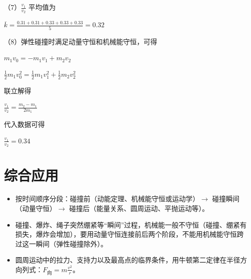 \documentclass[\gkver]{gaokaozhenti}
\begin{document}
\begin{enumerate}[resume=tiku]
{（7）$\frac{v_{1}}{v_{2}}$ 平均值为

$\overline{k}=\frac{0.31+0.31+0.33+0.33+0.33}{5}=0.32$

（8）弹性碰撞时满足动量守恒和机械能守恒，可得

$m_{1}v_{0}=-m_{1}v_{1}+m_{2}v_{2}$

$\frac{1}{2}m_{1}v_{0}^{2}=\frac{1}{2}m_{1}v_{1}^{2}+\frac{1}{2}m_{2}v_{2}^{2}$

联立解得

$\frac{v_{1}}{v_{2}}=\frac{m_{2}-m_{1}}{2m_{1}}$

代入数据可得

$\frac{v_{1}}{v_{2}}=0.34$
}

\end{enumerate}

\section{综合应用}
\begin{yaodian}
\begin{itemize}
\item 按时间顺序分段：碰撞前（动能定理、机械能守恒或运动学）$\rightarrow$ 碰撞瞬间（动量守恒）$\rightarrow$ 碰撞后（能量关系、圆周运动、平抛运动等）。
\item 碰撞、爆炸、绳子突然绷紧等“瞬间”过程，机械能一般不守恒（碰撞、绷紧有损失，爆炸会增加），要用动量守恒连接前后两个阶段，不能用机械能守恒跨过这一瞬间（弹性碰撞除外）。
\item 圆周运动中的拉力、支持力以及最高点的临界条件，用牛顿第二定律在半径方向列式：$F_{\text{向}}=m\frac{v^{2}}{r}$。
\end{itemize}
\end{yaodian}
\end{document}
